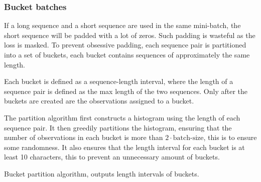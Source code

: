 \subsubsection{Bucket batches}

If a long sequence and a short sequence are used in the same mini-batch, the short sequence will be padded with a lot of zeros. Such padding is wasteful as the loss is masked. To prevent obsessive padding, each sequence pair is partitioned into a set of buckets, each bucket contains sequences of approximately the same length.

Each bucket is defined as a sequence-length interval, where the length of a sequence pair is defined as the max length of the two sequences. Only after the buckets are created are the observations assigned to a bucket.

The partition algorithm first constructs a histogram using the length of each sequence pair. It then greedily partitions the histogram, ensuring that the number of observations in each bucket is more than $2 \cdot \text{batch-size}$, this is to ensure some randomness. It also ensures that the length interval for each bucket is at least 10 characters, this to prevent an unnecessary amount of buckets.

\begin{algorithm}[H]
  \caption{Bucket partition algorithm, outputs length intervals of buckets.}
  \begin{algorithmic}[1]

         
         
        \Else
           \State {} 
            
        \EndIf
      \EndFor
      \State {}
    \EndFunction
  \end{algorithmic}
\end{algorithm}

